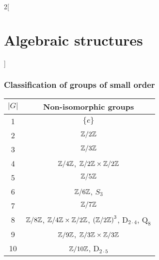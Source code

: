 \documentclass[../../../main.tex]{subfiles}
\begin{document}
\begin{multicols}{2}[\section{Algebraic structures}]
    \subsubsection{Classification of groups of small order}
    \begin{center}
        \begin{tabular}{|c|c|}
            \hline
            $|G|$ & Non-isomorphic groups                                                                                                                \\
            \hline
            1     & $\{e\}$                                                                                                                              \\
            \hline
            2     & $\quot{\ZZ}{2\ZZ}$                                                                                                                   \\
            \hline
            3     & $\quot{\ZZ}{3\ZZ}$                                                                                                                   \\
            \hline
            4     & $\quot{\ZZ}{4\ZZ}$, $\quot{\ZZ}{2\ZZ}\times\quot{\ZZ}{2\ZZ}$                                                                         \\
            \hline
            5     & $\quot{\ZZ}{5\ZZ}$                                                                                                                   \\
            \hline
            6     & $\quot{\ZZ}{6\ZZ}$, $S_3$                                                                                                            \\
            \hline
            7     & $\quot{\ZZ}{7\ZZ}$                                                                                                                   \\
            \hline
            8     & $\quot{\ZZ}{8\ZZ}$, $\quot{\ZZ}{4\ZZ}\times\quot{\ZZ}{2\ZZ}$, $\left(\quot{\ZZ}{2\ZZ}\right)^3$, $\text{D}_{2\cdot 4}$, $\text{Q}_8$ \\
            \hline
            9     & $\quot{\ZZ}{9\ZZ}$, $\quot{\ZZ}{3\ZZ}\times\quot{\ZZ}{3\ZZ}$                                                                         \\
            \hline
            10    & $\quot{\ZZ}{10\ZZ}$, $\text{D}_{2\cdot 5}$                                                                                           \\

\end{tabular}
\end{center}
\end{multicols}
\end{document}

